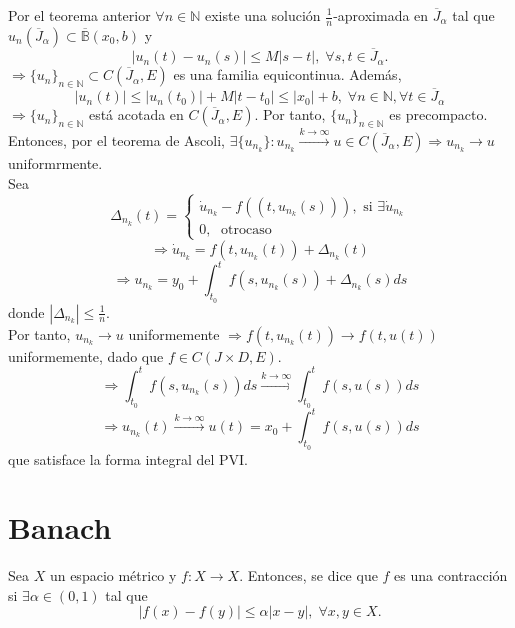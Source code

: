 \begin{dem}
  Por el teorema anterior $\forall n \in \mathbb{N}$ existe una solución $\frac{1}{n}$-aproximada en $\overline{J}_{\alpha}$ tal que $u_{n}(\overline{J}_{\alpha}) \subset \overline{\mathbb{B}}(x_{0}, b)$ y
  \[ 
    | u_{n}(t) - u_{n}(s) | \leq M |  s - t | , \; \forall s,t \in \overline{J}_{\alpha}.
  \] 
  $ \Rightarrow \{ u_{n} \}_{n \in \mathbb{N}} \subset C(\overline{J}_{\alpha}, E)$ es una familia equicontinua. Además, 
  \[ 
    | u_{n}(t) | \leq | u_{n}(t_{0}) | + M | t - t_{0} | \leq | x_{0} | + b,\; \forall n \in \mathbb{N}, \forall t \in \overline{J}_{\alpha}
  \] 
  $ \Rightarrow \{ u_{n} \}_{n \in \mathbb{N}}$ está acotada en $C(\overline{J}_{\alpha}, E)$. Por tanto, $\{ u_{n} \}_{n \in \mathbb{N}}$ es precompacto. \\

  Entonces, por el teorema de Ascoli, $\exists \{ u_{n_{k}} \}: u_{n_{k}} \xrightarrow[]{ k \rightarrow \infty} u \in C(\overline{J}_{\alpha}, E) \Rightarrow u_{n_{k}} \rightarrow u$ uniformrmente. \\

  Sea
  \[
    \Delta_{n_{k}}(t)  =
    \begin{cases}
      \dot{u}_{n_{k}} - f((t, u_{n_{k}}(s))), \text{ si } \exists \dot{u}_{n_{k}}\\
      0, \; \text{ otrocaso }
    \end{cases}
  \]
  \[ 
    \Rightarrow \dot{u}_{n_{k}} = f(t, u_{n_{k}}(t)) + \Delta_{n_{k}}(t)
  \] 
  \[ 
    \Rightarrow u_{n_{k}} = y_{0} + \int_{t_{0}}^{t} f(s, u_{n_{k}}(s)) + \Delta_{n_{k}}(s) ds
  \] 
  donde $| \Delta_{n_{k}} | \leq \frac{1}{n}$. \\

  Por tanto, $u_{n_{k}} \rightarrow u$ uniformemente $\Rightarrow f(t, u_{n_{k}}(t)) \rightarrow f(t, u(t))$ uniformemente, dado que $f \in C(J \times D, E)$.
  \[ 
    \Rightarrow \int_{t_{0}}^{t} f(s,u_{n_{k}}(s)) ds \xrightarrow[]{k \rightarrow \infty} \int_{t_{0}}^{t}  f(s, u(s)) ds
  \] 
  \[ 
    \Rightarrow  u_{n_{k}}(t) \xrightarrow[]{ k \rightarrow \infty } u(t) = x_{0} + \int_{t_{0}}^{t} f(s, u(s)) ds  
  \] 
  que satisface la forma integral del PVI.
\end{dem}

\section{Banach}

\begin{defn}
  Sea $X$ un espacio métrico y $f: X \to X$. Entonces, se dice que $f$ es una contracción si $\exists \alpha \in (0,1)$ tal que
  \[ 
    | f(x) - f(y) | \leq \alpha | x - y |, \; \forall x, y \in X.
  \] 
\end{defn}

